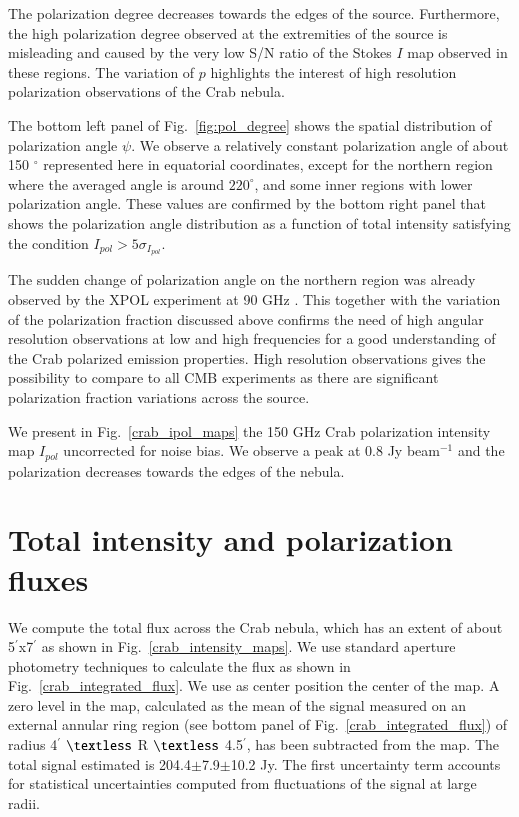 \documentclass[twocolumn,traditabstract]{aa}
\begin{document}
The polarization degree decreases towards the edges of the
source. Furthermore, the high polarization degree observed at the extremities of the source is misleading and caused by the very low S/N ratio of the Stokes $I$ map observed in these regions. The variation of $p$ highlights the interest of high resolution polarization
observations of the Crab nebula. 

The bottom left panel of Fig.~\ref{fig:pol_degree} shows the spatial distribution of polarization angle
$\psi$.  We observe a relatively constant polarization
angle of about 150 $^{\circ}$ represented here in equatorial coordinates, except
for the northern region where the averaged angle is around $220^{\circ}$, and
some inner regions with lower polarization angle.  These values are confirmed by
the bottom right panel that shows the polarization angle distribution as a
function of total intensity satisfying the condition $I_{pol} > 5\sigma_{I_{pol}}$.

The sudden change of polarization angle on the northern region was already
observed by the XPOL experiment at 90 GHz \citep{aumont2010}.  This together
with the variation of the polarization fraction discussed above confirms the
need of high angular resolution observations at low and high frequencies for a
good understanding of the Crab polarized emission properties.
High resolution observations gives the possibility to compare to all CMB experiments as there are significant polarization fraction variations across the source.

We present in Fig.~\ref{crab_ipol_maps} the 150 GHz Crab polarization intensity
map $I_{pol}$ uncorrected for noise bias. We observe a peak at 0.8 Jy beam$^{-1}$ and the polarization
decreases towards the edges of the nebula.


\section{Total intensity and polarization fluxes}\label{sec:Polarization estimates in CMB experiments like beams}
We compute the total flux across the Crab nebula, which has an extent of about
5$^{\prime}$x7$^{\prime}$ as shown in Fig.~\ref{crab_intensity_maps}.  We use
standard aperture photometry techniques to calculate the flux as shown in
Fig.~\ref{crab_integrated_flux}. We use as center position the center of the
map. A zero level in the map, calculated as the mean of the signal measured on
an external annular ring region (see bottom panel of
Fig.~\ref{crab_integrated_flux}) of radius 4$^\prime$ $\textless$ R $\textless$
4.5$^\prime$, has been subtracted from the map. The total signal estimated is
204.4$\pm$7.9$\pm$10.2 Jy. The first uncertainty term accounts for statistical
uncertainties computed from fluctuations of the signal at large radii.
\end{document}
